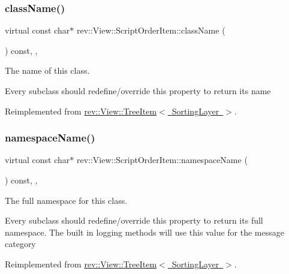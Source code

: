 \subsubsection{\texorpdfstring{className()}{className()}}
{\footnotesize\ttfamily virtual const char$\ast$ rev\+::\+View\+::\+Script\+Order\+Item\+::class\+Name (\begin{DoxyParamCaption}{ }\end{DoxyParamCaption}) const\hspace{0.3cm}{\ttfamily [inline]}, {\ttfamily [override]}, {\ttfamily [virtual]}}



The name of this class. 

Every subclass should redefine/override this property to return its name 

Reimplemented from \mbox{\hyperlink{classrev_1_1_view_1_1_tree_item_a8a12a6ceece6cab7a2299da2b5e6a54b}{rev\+::\+View\+::\+Tree\+Item$<$ Sorting\+Layer $>$}}.

\mbox{\label{classrev_1_1_view_1_1_script_order_item_a1ac64a1d792c531644e8acea2385effd}} 
\subsubsection{\texorpdfstring{namespaceName()}{namespaceName()}}
{\footnotesize\ttfamily virtual const char$\ast$ rev\+::\+View\+::\+Script\+Order\+Item\+::namespace\+Name (\begin{DoxyParamCaption}{ }\end{DoxyParamCaption}) const\hspace{0.3cm}{\ttfamily [inline]}, {\ttfamily [override]}, {\ttfamily [virtual]}}



The full namespace for this class. 

Every subclass should redefine/override this property to return its full namespace. The built in logging methods will use this value for the message category 

Reimplemented from \mbox{\hyperlink{classrev_1_1_view_1_1_tree_item_a3bb552a87176f4b12848e43dfdd287b2}{rev\+::\+View\+::\+Tree\+Item$<$ Sorting\+Layer $>$}}.

\mbox{\label{classrev_1_1_view_1_1_script_order_item_a1bdbd86e1f9e909818b5389266151024}} 
